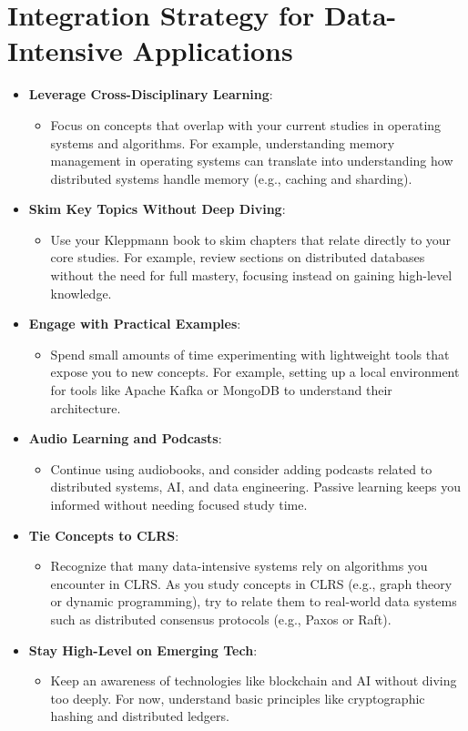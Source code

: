 \documentclass{article}
\begin{document}
\section{Integration Strategy for Data-Intensive Applications}

\begin{itemize}
    \item \textbf{Leverage Cross-Disciplinary Learning}:
    \begin{itemize}
        \item Focus on concepts that overlap with your current studies in operating systems and algorithms. For example, understanding memory management in operating systems can translate into understanding how distributed systems handle memory (e.g., caching and sharding).
    \end{itemize}
    
    \item \textbf{Skim Key Topics Without Deep Diving}:
    \begin{itemize}
        \item Use your Kleppmann book to skim chapters that relate directly to your core studies. For example, review sections on distributed databases without the need for full mastery, focusing instead on gaining high-level knowledge.
    \end{itemize}
    
    \item \textbf{Engage with Practical Examples}:
    \begin{itemize}
        \item Spend small amounts of time experimenting with lightweight tools that expose you to new concepts. For example, setting up a local environment for tools like Apache Kafka or MongoDB to understand their architecture.
    \end{itemize}
    
    \item \textbf{Audio Learning and Podcasts}:
    \begin{itemize}
        \item Continue using audiobooks, and consider adding podcasts related to distributed systems, AI, and data engineering. Passive learning keeps you informed without needing focused study time.
    \end{itemize}
    
    \item \textbf{Tie Concepts to CLRS}:
    \begin{itemize}
        \item Recognize that many data-intensive systems rely on algorithms you encounter in CLRS. As you study concepts in CLRS (e.g., graph theory or dynamic programming), try to relate them to real-world data systems such as distributed consensus protocols (e.g., Paxos or Raft).
    \end{itemize}
    
    \item \textbf{Stay High-Level on Emerging Tech}:
    \begin{itemize}
        \item Keep an awareness of technologies like blockchain and AI without diving too deeply. For now, understand basic principles like cryptographic hashing and distributed ledgers.
    \end{itemize}
\end{itemize}
\end{document}
